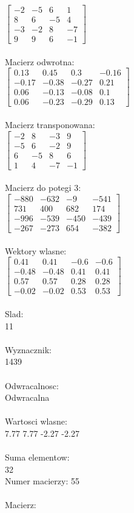 \documentclass[a4paper,12pt]{article}
\begin{document}
$\begin{bmatrix} -2&-5&6&1\\8&6&-5&4\\-3&-2&8&-7\\9&9&6&-1 \end{bmatrix}$
\\
\\
Macierz odwrotna:\\

$\begin{bmatrix} 0.13&0.45&0.3&-0.16\\-0.17&-0.38&-0.27&0.21\\0.06&-0.13&-0.08&0.1\\0.06&-0.23&-0.29&0.13 \end{bmatrix}$
\\
\\
Macierz transponowana:\\

$\begin{bmatrix} -2&8&-3&9\\-5&6&-2&9\\6&-5&8&6\\1&4&-7&-1 \end{bmatrix}$
\\
\\
Macierz do potegi 3:\\

$\begin{bmatrix} -880&-632&-9&-541\\731&400&682&174\\-996&-539&-450&-439\\-267&-273&654&-382 \end{bmatrix}$
\\
\\
Wektory wlasne:\\

$\begin{bmatrix} 0.41&0.41&-0.6&-0.6\\-0.48&-0.48&0.41&0.41\\0.57&0.57&0.28&0.28\\-0.02&-0.02&0.53&0.53 \end{bmatrix}$
\\
\\
Slad:\\
11
\\
\\
Wyznacznik:\\
1439
\\
\\
Odwracalnosc:\\
Odwracalna
\\
\\
Wartosci wlasne:\\
7.77 7.77 -2.27 -2.27
\\
\\
Suma elementow:\\
32
\\
\newpage
Numer macierzy:
55
\\
\\
Macierz:\\
\end{document}
